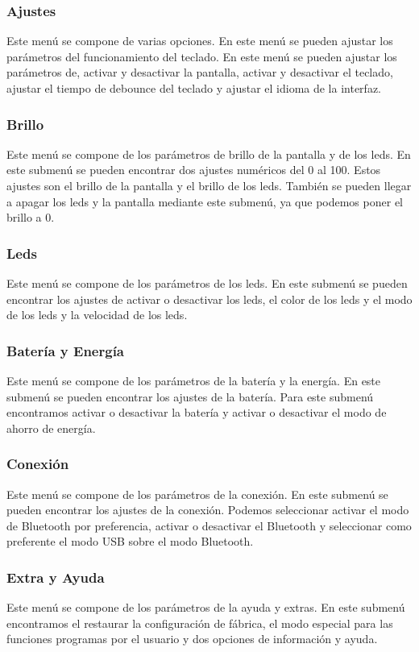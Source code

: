 \subsubsection{Ajustes}
Este menú se compone de varias opciones. En este menú se pueden ajustar los parámetros del funcionamiento del teclado. En este menú se pueden ajustar los parámetros de, activar y desactivar la pantalla, activar y desactivar el teclado, ajustar el tiempo de debounce del teclado y ajustar el idioma de la interfaz.

\subsubsection{Brillo}
Este menú se compone de los parámetros de brillo de la pantalla y de los leds. En este submenú se pueden encontrar dos ajustes numéricos del 0 al 100. Estos ajustes son el brillo de la pantalla y el brillo de los leds. También se pueden llegar a apagar los leds y la pantalla mediante este submenú, ya que podemos poner el brillo a 0.

\subsubsection{Leds}
Este menú se compone de los parámetros de los leds. En este submenú se pueden encontrar los ajustes de activar o desactivar los leds, el color de los leds y el modo de los leds y la velocidad de los leds.

\subsubsection{Batería y Energía}
Este menú se compone de los parámetros de la batería y la energía. En este submenú se pueden encontrar los ajustes de la batería. Para este submenú encontramos activar o desactivar la batería y activar o desactivar el modo de ahorro de energía.

\subsubsection{Conexión}
Este menú se compone de los parámetros de la conexión. En este submenú se pueden encontrar los ajustes de la conexión. Podemos seleccionar activar el modo de Bluetooth por preferencia, activar o desactivar el Bluetooth y seleccionar como preferente el modo USB sobre el modo Bluetooth.

\subsubsection{Extra y Ayuda}
Este menú se compone de los parámetros de la ayuda y extras. En este submenú encontramos el restaurar la configuración de fábrica, el modo especial para las funciones programas por el usuario y dos opciones de información y ayuda.

